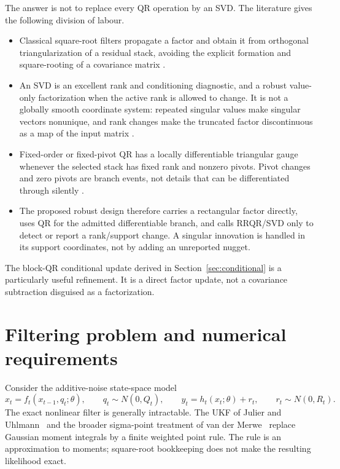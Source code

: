 \documentclass[11pt]{article}
\begin{document}
The answer is not to replace every QR operation by an SVD.  The literature gives
the following division of labour.

\begin{itemize}
  \item Classical square-root filters propagate a factor and obtain it from
        orthogonal triangularization of a residual stack, avoiding the explicit
        formation and square-rooting of a covariance matrix
        \cite{kaminski1971, bierman1977, maybeck1979, vandermerwewan2001,
        arasaratnamhaykin2008}.
  \item An SVD is an excellent rank and conditioning diagnostic, and a robust
        value-only factorization when the active rank is allowed to change.  It
        is not a globally smooth coordinate system: repeated singular values
        make singular vectors nonunique, and rank changes make the truncated
        factor discontinuous as a map of the input matrix
        \cite{stewartsun1990, golubvanloan2013, ionescu2015}.
  \item Fixed-order or fixed-pivot QR has a locally differentiable triangular
        gauge whenever the selected stack has fixed rank and nonzero pivots.
        Pivot changes and zero pivots are branch events, not details that can be
        differentiated through silently \cite{magnusneudecker1999,
        golubvanloan2013, chan1987, gu1996}.
  \item The proposed robust design therefore carries a rectangular factor
        directly, uses QR for the admitted differentiable branch, and calls
        RRQR/SVD only to detect or report a rank/support change.  A singular
        innovation is handled in its support coordinates, not by adding an
        unreported nugget.
\end{itemize}

The block-QR conditional update derived in Section~\ref{sec:conditional} is a
particularly useful refinement.  It is a direct factor update, not a covariance
subtraction disguised as a factorization.

\section{Filtering problem and numerical requirements}

Consider the additive-noise state-space model
\begin{equation}
 x_t=f_t(x_{t-1},q_t;\theta),\qquad q_t\sim N(0,Q_t),
 \qquad y_t=h_t(x_t;\theta)+r_t,\qquad r_t\sim N(0,R_t).
 \label{eq:model}
\end{equation}
The exact nonlinear filter is generally intractable.  The UKF of Julier and
Uhlmann~\cite{julieruhlmann1997} and the broader sigma-point treatment of van
der Merwe~\cite{vandermerwe2004} replace Gaussian moment integrals by a finite
weighted point rule.  The rule is an approximation to moments; square-root
bookkeeping does not make the resulting likelihood exact.
\end{document}
